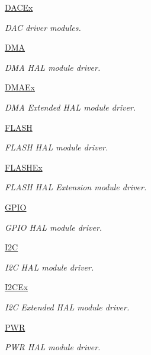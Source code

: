 \begin{DoxyCompactItemize}
\mbox{\hyperlink{group___d_a_c_ex}{D\+A\+C\+Ex}}
\begin{DoxyCompactList}\small\item\em D\+AC driver modules. \end{DoxyCompactList}\item 
\mbox{\hyperlink{group___d_m_a}{D\+MA}}
\begin{DoxyCompactList}\small\item\em D\+MA H\+AL module driver. \end{DoxyCompactList}\item 
\mbox{\hyperlink{group___d_m_a_ex}{D\+M\+A\+Ex}}
\begin{DoxyCompactList}\small\item\em D\+MA Extended H\+AL module driver. \end{DoxyCompactList}\item 
\mbox{\hyperlink{group___f_l_a_s_h}{F\+L\+A\+SH}}
\begin{DoxyCompactList}\small\item\em F\+L\+A\+SH H\+AL module driver. \end{DoxyCompactList}\item 
\mbox{\hyperlink{group___f_l_a_s_h_ex}{F\+L\+A\+S\+H\+Ex}}
\begin{DoxyCompactList}\small\item\em F\+L\+A\+SH H\+AL Extension module driver. \end{DoxyCompactList}\item 
\mbox{\hyperlink{group___g_p_i_o}{G\+P\+IO}}
\begin{DoxyCompactList}\small\item\em G\+P\+IO H\+AL module driver. \end{DoxyCompactList}\item 
\mbox{\hyperlink{group___i2_c}{I2C}}
\begin{DoxyCompactList}\small\item\em I2C H\+AL module driver. \end{DoxyCompactList}\item 
\mbox{\hyperlink{group___i2_c_ex}{I2\+C\+Ex}}
\begin{DoxyCompactList}\small\item\em I2C Extended H\+AL module driver. \end{DoxyCompactList}\item 
\mbox{\hyperlink{group___p_w_r}{P\+WR}}
\begin{DoxyCompactList}\small\item\em P\+WR H\+AL module driver. \end{DoxyCompactList}\item 

\end{DoxyCompactItemize}
